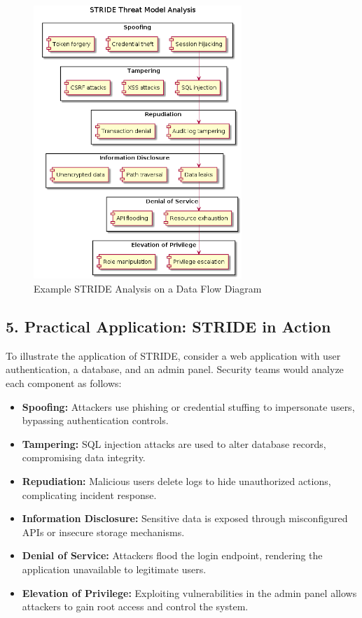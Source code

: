 \begin{figure}[H]
	\centering
	\includegraphics[width=0.7\textwidth]{images/stride-analysis}
	\caption{Example STRIDE Analysis on a Data Flow Diagram}
\end{figure}

\subsection*{5. Practical Application: STRIDE in Action}
To illustrate the application of STRIDE, consider a web application with user authentication, a database, and an admin panel. Security teams would analyze each component as follows:
\begin{itemize}
	\item \textbf{Spoofing:} Attackers use phishing or credential stuffing to impersonate users, bypassing authentication controls.
	\item \textbf{Tampering:} SQL injection attacks are used to alter database records, compromising data integrity.
	\item \textbf{Repudiation:} Malicious users delete logs to hide unauthorized actions, complicating incident response.
	\item \textbf{Information Disclosure:} Sensitive data is exposed through misconfigured APIs or insecure storage mechanisms.
	\item \textbf{Denial of Service:} Attackers flood the login endpoint, rendering the application unavailable to legitimate users.
	\item \textbf{Elevation of Privilege:} Exploiting vulnerabilities in the admin panel allows attackers to gain root access and control the system.
\end{itemize}

